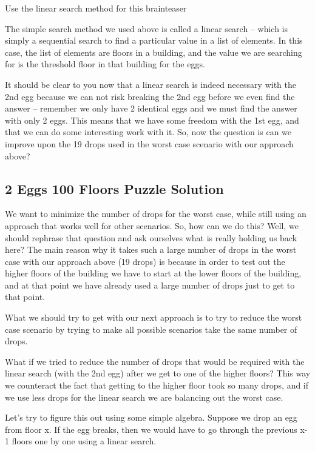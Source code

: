 \documentclass[]{article}
\begin{document}
Use the linear search method for this brainteaser

The simple search method we used above is called a linear search – which is simply a sequential search to find a particular value in a list of elements. In this case, the list of elements are floors in a building, and the value we are searching for is the threshold floor in that building for the eggs.

It should be clear to you now that a linear search is indeed necessary with the 2nd egg because we can not risk breaking the 2nd egg before we even find the answer – remember we only have 2 identical eggs and we must find the answer with only 2 eggs. This means that we have some freedom with the 1st egg, and that we can do some interesting work with it. So, now the question is can we improve upon the 19 drops used in the worst case scenario with our approach above?

\subsection{2 Eggs 100 Floors Puzzle Solution}




 
We want to minimize the number of drops for the worst case, while still using an approach that works well for other scenarios. So, how can we do this? Well, we should rephrase that question and ask ourselves what is really holding us back here? The main reason why it takes such a large number of drops in the worst case with our approach above (19 drops) is because in order to test out the higher floors of the building we have to start at the lower floors of the building, and at that point we have already used a large number of drops just to get to that point.

What we should try to get with our next approach is to try to reduce the worst case scenario by trying to make all possible scenarios take the same number of drops.

What if we tried to reduce the number of drops that would be required with the linear search (with the 2nd egg) after we get to one of the higher floors? This way we counteract the fact that getting to the higher floor took so many drops, and if we use less drops for the linear search we are balancing out the worst case.

Let’s try to figure this out using some simple algebra. Suppose we drop an egg from floor x. If the egg breaks, then we would have to go through the previous x-1 floors one by one using a linear search.
\end{document}
